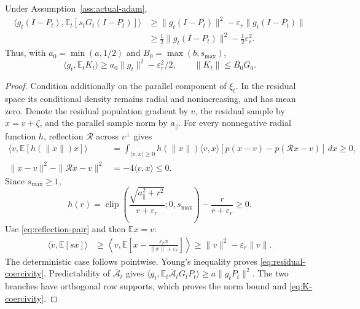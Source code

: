 \begin{lemma}
\label{lem:radial-residual}
Under Assumption~\ref{ass:actual-adam},
\begin{align}
 \langle g_t(I-P_t),\mathbb E_t[s_tG_t(I-P_t)]\rangle
 &\ge\|g_t(I-P_t)\|^2-\varepsilon_r\|g_t(I-P_t)\|\\
 &\ge\tfrac12\|g_t(I-P_t)\|^2-\tfrac12\varepsilon_r^2.\label{eq:residual-coercivity}
\end{align}
Thus, with $a_0=\min(a,1/2)$ and $B_0=\max(b,s_{\max})$,
\begin{equation}
 \langle g_t,\mathbb E_tK_t\rangle
 \ge a_0\|g_t\|^2-\varepsilon_r^2/2,\qquad
 \|K_t\|\le B_0G_0.\label{eq:K-coercivity}
\end{equation}
\end{lemma}
\begin{proof}
Condition additionally on the parallel component of $\xi_t$. In the residual
space its conditional density remains radial and nonincreasing, and has
mean zero. Denote the residual population gradient by $v$, the residual
sample by $x=v+\zeta$, and the parallel sample norm by $a_\parallel$.
For every nonnegative radial function $h$, reflection $\mathcal R$ across
$v^\perp$ gives
\begin{align}
 \langle v,\mathbb E[h(\|x\|)x]\rangle
 &=\int_{\langle v,x\rangle\ge0}
 h(\|x\|)\langle v,x\rangle
       [p(x-v)-p(\mathcal Rx-v)]\,dx\ge0,\label{eq:reflection-pair}\\
 \|x-v\|^2-\|\mathcal Rx-v\|^2&=-4\langle v,x\rangle\le0.
\end{align}
Since $s_{\max}\ge1$,
\begin{equation}
 h(r)=\operatorname{clip}\left(\frac{\sqrt{a_\parallel^2+r^2}}
                                    {r+\varepsilon_r};0,s_{\max}\right)
                     -\frac r{r+\varepsilon_r}\ge0.
\end{equation}
Use \eqref{eq:reflection-pair} and then $\mathbb E x=v$:
\begin{align}
 \langle v,\mathbb E[sx]\rangle
 &\ge\left\langle v,\mathbb E\left[x-
                    \frac{\varepsilon_r x}{\|x\|+\varepsilon_r}\right]\right\rangle
 \ge\|v\|^2-\varepsilon_r\|v\|.
\end{align}
The deterministic case follows pointwise. Young's inequality proves
\eqref{eq:residual-coercivity}. Predictability of
$\overline{\mathcal A}_t$ gives
$\langle g_t,\mathbb E_t\overline{\mathcal A}_tG_tP_t\rangle
\ge a\|g_tP_t\|^2$. The two branches have orthogonal row supports,
which proves the norm bound and \eqref{eq:K-coercivity}.
\end{proof}

